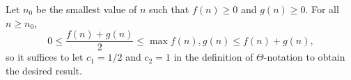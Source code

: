 Let $n_0$ be the smallest value of $n$ such that $f(n)\ge0$ and $g(n)\ge0$.
For all $n\ge n_0$,
\[
    0 \le \frac{f(n)+g(n)}{2} \le \max{f(n),g(n)} \le f(n)+g(n),
\]
so it suffices to let $c_1=1/2$ and $c_2=1$ in the definition of $\Theta$-notation to obtain the desired result.
